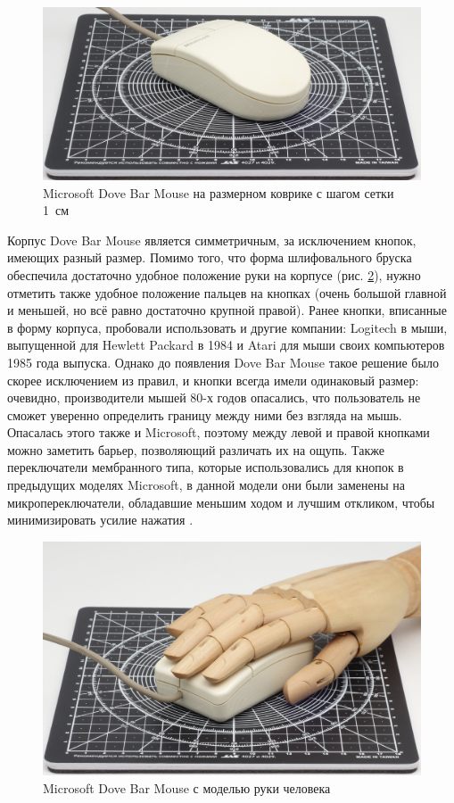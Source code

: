 \documentclass[11pt, a4paper]{article}
\begin{document}
\begin{figure}[h]
    \centering
    \includegraphics[scale=0.5]{1987_microsoft_dove_bar_mouse/size.jpg}
    \caption{Microsoft Dove Bar Mouse на размерном коврике с шагом сетки 1~см}
    \label{fig:MicrosoftDoveBarSize}
\end{figure}

Корпус Dove Bar Mouse является симметричным, за исключением кнопок, имеющих разный размер. Помимо того, что форма шлифовального бруска обеспечила достаточно удобное положение руки на корпусе (рис. \ref{fig:MicrosoftDoveBarHand}), нужно отметить также удобное положение пальцев на кнопках (очень большой главной и меньшей, но всё равно достаточно крупной правой). Ранее кнопки, вписанные в форму корпуса, пробовали использовать и другие компании: Logitech в мыши, выпущенной для Hewlett Packard в 1984 и Atari для мыши своих компьютеров 1985 года выпуска. Однако до появления Dove Bar Mouse такое решение было скорее исключением из правил, и кнопки всегда имели одинаковый размер: очевидно, производители мышей 80-х годов опасались, что пользователь не сможет уверенно определить границу между ними без взгляда на мышь. Опасалась этого также и Microsoft, поэтому между левой и правой кнопками можно заметить барьер, позволяющий различать их на ощупь. Также переключатели мембранного типа, которые использовались для кнопок в предыдущих моделях Microsoft, в данной модели они были заменены на микропереключатели, обладавшие меньшим ходом и лучшим откликом, чтобы минимизировать усилие нажатия \cite{doveBarDesign2, doveBarMousePcMag3}.

\begin{figure}[h]
    \centering
    \includegraphics[scale=0.45]{1987_microsoft_dove_bar_mouse/hand.jpg}
    \caption{Microsoft Dove Bar Mouse с моделью руки человека}
    \label{fig:MicrosoftDoveBarHand}
\end{figure}
\end{document}
